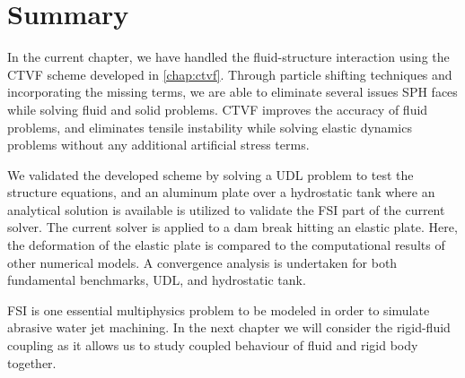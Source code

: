 \section{Summary}\label{fsi:summary}
In the current chapter, we have handled the fluid-structure interaction using
the CTVF scheme developed in \cref{chap:ctvf}. Through particle shifting
techniques and incorporating the missing terms, we are able to eliminate several
issues SPH faces while solving fluid and solid problems. CTVF improves the
accuracy of fluid problems, and eliminates tensile instability while solving
elastic dynamics problems without any additional artificial stress terms.

We validated the developed scheme by solving a UDL problem to test the structure
equations, and an aluminum plate over a hydrostatic tank where an analytical
solution is available is utilized to validate the FSI part of the current
solver. The current solver is applied to a dam break hitting an elastic plate.
Here, the deformation of the elastic plate is compared to the computational
results of other numerical models. A convergence analysis is undertaken for both fundamental benchmarks,
UDL, and hydrostatic tank.

FSI is one essential multiphysics problem to be modeled in order to simulate
abrasive water jet machining. In the next chapter we will consider the rigid-fluid
coupling as it allows us to study coupled behaviour of fluid and rigid body
together.
